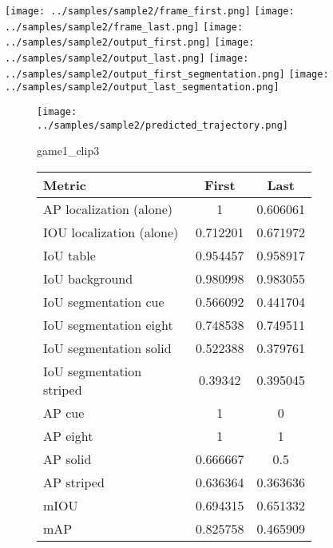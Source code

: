 \begin{figure}
    \texttt{[image: ../samples/sample2/frame\_first.png]}
    \texttt{[image: ../samples/sample2/frame\_last.png]}
    \newline
    \texttt{[image: ../samples/sample2/output\_first.png]}
    \texttt{[image: ../samples/sample2/output\_last.png]}
    \newline
    \texttt{[image: ../samples/sample2/output\_first\_segmentation.png]}
    \texttt{[image: ../samples/sample2/output\_last\_segmentation.png]}
    \newline
    \begin{subfigure}[b]{0.49\textwidth}
        \vspace{20pt}
        \texttt{[image: ../samples/sample2/predicted\_trajectory.png]}
        \caption*{game1\_clip3}
    \end{subfigure}
\begin{subfigure}[b]{0.49\textwidth}
    \begin{tabular}{|l|c|c|}
        \hline
        \textbf{Metric} & \textbf{First} & \textbf{Last} \\
        \hline
        AP localization (alone) & 1 & 0.606061 \\ 
        IOU localization (alone) & 0.712201 & 0.671972 \\ 
        \hline
        IoU table & 0.954457 & 0.958917 \\ 
        IoU background & 0.980998 & 0.983055 \\ 
        \hline
        IoU segmentation cue & 0.566092 & 0.441704 \\ 
        IoU segmentation eight & 0.748538 & 0.749511 \\ 
        IoU segmentation solid & 0.522388 & 0.379761 \\ 
        IoU segmentation striped & 0.39342 & 0.395045 \\ 
        \hline
        AP cue & 1 & 0 \\ 
        AP eight & 1 & 1 \\ 
        AP solid & 0.666667 & 0.5 \\ 
        AP striped & 0.636364 & 0.363636 \\ 
        \hline
        mIOU & 0.694315 & 0.651332 \\ 
        mAP & 0.825758 & 0.465909 \\ 
        \hline
    \end{tabular}    
\end{subfigure}
\end{figure}

